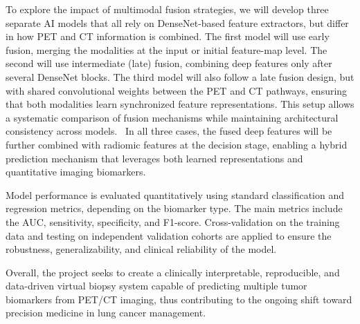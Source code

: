To explore the impact of multimodal fusion strategies, we will develop three separate AI models that all rely on DenseNet-based feature extractors, but differ in how PET and CT information is combined. The first model will use early fusion, merging the modalities at the input or initial feature-map level. The second will use intermediate (late) fusion, combining deep features only after several DenseNet blocks. The third model will also follow a late fusion design, but with shared convolutional weights between the PET and CT pathways, ensuring that both modalities learn synchronized feature representations. This setup allows a systematic comparison of fusion mechanisms while maintaining architectural consistency across models.~\cite{Da-Ano2024-oo} In all three cases, the fused deep features will be further combined with radiomic features at the decision stage, enabling a hybrid prediction mechanism that leverages both learned representations and quantitative imaging biomarkers.~\cite{Li2024-np}


Model performance is evaluated quantitatively using standard classification and regression metrics, depending on the biomarker type. The main metrics include the AUC, sensitivity, specificity, and F1-score. Cross-validation on the training data and testing on independent validation cohorts are applied to ensure the robustness, generalizability, and clinical reliability of the model. 

Overall, the project seeks to create a clinically interpretable, reproducible, and data-driven virtual biopsy system capable of predicting multiple tumor biomarkers from PET/CT imaging, thus contributing to the ongoing shift toward precision medicine in lung cancer management.
